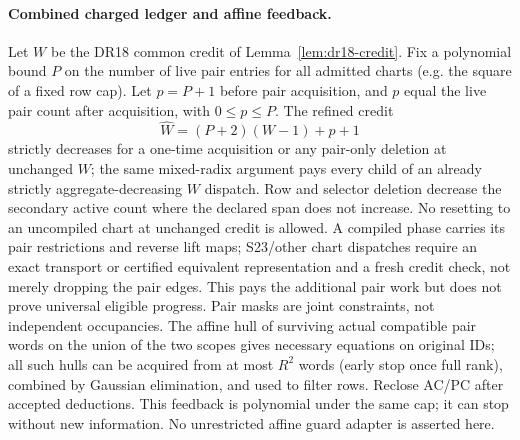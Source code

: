 \documentclass[11pt]{article}
\begin{document}
\paragraph{Combined charged ledger and affine feedback.}
Let $W$ be the DR18 common credit of Lemma~\ref{lem:dr18-credit}. Fix a polynomial bound $P$ on the number of live pair entries for all admitted charts (e.g. the square of a fixed row cap). Let $p=P+1$ before pair acquisition, and $p$ equal the live pair count after acquisition, with $0\le p\le P$. The refined credit
\[
 \widehat W=(P+2)(W-1)+p+1
\]
strictly decreases for a one-time acquisition or any pair-only deletion at unchanged $W$; the same mixed-radix argument pays every child of an already strictly aggregate-decreasing $W$ dispatch. Row and selector deletion decrease the secondary active count where the declared span does not increase. No resetting to an uncompiled chart at unchanged credit is allowed. A compiled phase carries its pair restrictions and reverse lift maps; S23/other chart dispatches require an exact transport or certified equivalent representation and a fresh credit check, not merely dropping the pair edges. This pays the additional pair work but does not prove universal eligible progress. Pair masks are joint constraints, not independent occupancies. The affine hull of surviving actual compatible pair words on the union of the two scopes gives necessary equations on original IDs; all such hulls can be acquired from at most $R^2$ words (early stop once full rank), combined by Gaussian elimination, and used to filter rows. Reclose AC/PC after accepted deductions. This feedback is polynomial under the same cap; it can stop without new information. No unrestricted affine guard adapter is asserted here.
\end{document}
